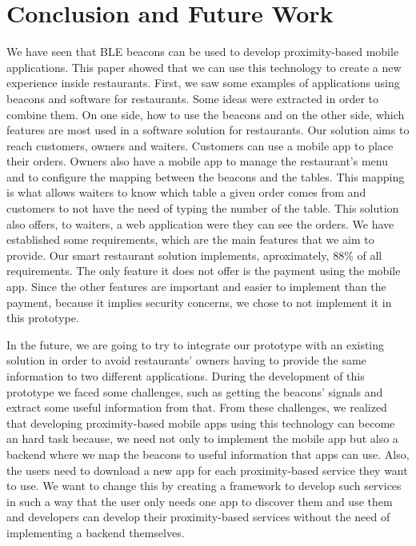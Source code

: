 
\section{Conclusion and Future Work}
\label{sec:conclusion_and_future_work}
We have seen that BLE beacons can be used to develop proximity-based
mobile applications. This paper showed that we can use this technology
to create a new experience inside restaurants.
First, we saw some examples of applications using beacons and software
for restaurants. Some ideas were extracted in order to combine them.
On one side, how to use the beacons and on the other side, which
features are most used in a software solution for restaurants.
Our solution aims to reach customers, owners and waiters.
Customers can use a mobile app to place their orders.
Owners also have a mobile app to manage the restaurant's menu and to
configure the mapping between the beacons and the tables.
This mapping is what allows waiters to know which table a given order
comes from
and customers to not have the need of typing the number of the table.
This solution also offers, to waiters, a web application were they
can see the orders.
We have established some requirements, which are the main
features that we aim to provide.
Our smart restaurant solution implements, aproximately,
88\% of all requirements. The only feature it does not offer is
the payment using the mobile app. Since the other features are
important and easier to implement than the payment, because
it implies security concerns, we chose to not implement it in
this prototype.

In the future, we are going to try to integrate our
prototype with an existing solution in order to avoid
restaurants' owners having to provide the same information
to two different applications. During the development
of this prototype we faced some challenges, such as
getting the beacons' signals and extract some useful
information from that. From these challenges, we
realized that developing proximity-based mobile
apps using this technology can become an hard task
because, we need not only to implement the mobile app
but also a backend where we map the beacons to
useful information that apps can use. Also, the users
need to download a new app for each proximity-based
service they want to use. We want to change this
by creating a framework to develop such services
in such a way that the user only needs one app
to discover them and use them and developers
can develop their proximity-based services
without the need of implementing a backend
themselves.
